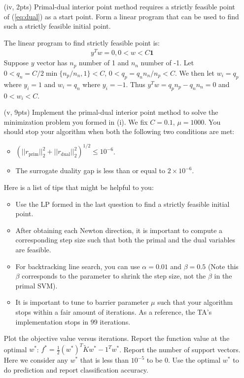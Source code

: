 \documentclass{article}
\theoremstyle{remark}
\theoremstyle{definition}
\begin{document}
\begin{enumerate}[(a)]
\begin{enumerate}[(i)]
    \item[(iv, 2pts)]   Primal-dual interior point method requires a strictly feasible point of (\ref{eq:dual}) as a start point. Form a linear program that can be used to find such a strictly feasible initial point.

    {
    \color{blue}
    The linear program to find strictly feasible point is:
    \begin{align*}
        y^T w = 0, 0< w < C\mathbf{1}
    \end{align*}
    Suppose $y$ vector has $n_p$ number of 1 and $n_n$ number of -1. Let $0 < q_n = C/2\min\{n_p/n_n,1\} < C$, $0< q_p = q_nn_n/n_p < C$. We then let $w_i=q_p$ where $y_i=1$ and $w_i=q_n$ where $y_i=-1$. Thus $y^Tw=q_pn_p - q_nn_n=0$ and $0<w_i<C$.
    }
    \item[(v, 9pts)]   Implement the primal-dual interior point method to solve the minimization problem you formed in (i). We fix $C = 0.1$, $\mu = 1000$. You should stop your algorithm when both the following two conditions are met:
        \begin{itemize}
          \item   $(||r_{\text{prim}}||_2^2 + ||r_{\text{dual}}||_2^2)^{1/2}\leq 10^{-6}$.
          \item   The surrogate duality gap is less than or equal to $2\times 10^{-6}$.
        \end{itemize}
      Here is a list of tips that might be helpful to you:
      \begin{itemize}
          \item   Use the LP formed in the last question to find a strictly feasible initial point.
          \item   After obtaining each Newton direction, it is important to compute a corresponding step size such that both the primal and the dual variables are feasible. 
          \item   For backtracking line search, you can use $\alpha = 0.01$ and $\beta = 0.5$ (Note this $\beta$ corresponds to the parameter to shrink the step size, not the $\beta$ in the primal SVM).
          \item   It is important to tune to barrier parameter $\mu$ such that your algorithm stops within a fair amount of iterations. As a reference, the TA's implementation stops in $99$ iterations.
      \end{itemize}
      Plot the objective value versus iterations.
      Report the function value at the optimal $w^*$: $f^* = \frac{1}{2}(w^*)^T\tilde{K}w^* - 1^Tw^*$. Report the number of support vectors. Here we consider any $w^*$ that is less than $10^{-5}$ to be $0$. Use the optimal $w^*$ to do prediction and report classification accuracy. 
      

\end{enumerate}
\end{enumerate}
\end{document}

